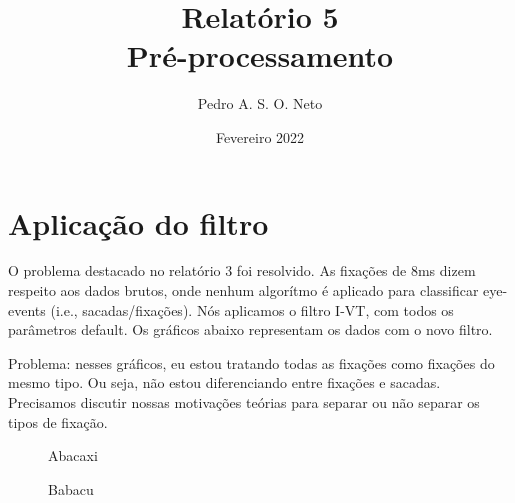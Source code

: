 \documentclass{article}
\title{Relatório 5 \\ Pré-processamento}
\author{Pedro A. S. O. Neto}
\date{Fevereiro 2022}
\begin{document}
\maketitle

\section{Aplicação do filtro}

O problema destacado no relatório 3 foi resolvido. As fixações de 8ms dizem respeito aos dados brutos, onde nenhum algorítmo é aplicado para classificar eye-events (i.e., sacadas/fixações).
Nós aplicamos o filtro I-VT, com todos os parâmetros default. Os gráficos abaixo representam os dados com o novo filtro.

Problema: nesses gráficos, eu estou tratando todas as fixações como fixações do mesmo tipo. Ou seja, não estou diferenciando entre fixações e sacadas. Precisamos discutir nossas motivações teórias para separar ou não separar os tipos de fixação.

\begin{figure}[t]
\caption{Abacaxi}
\noindent{}
\centering
\end{figure}

\begin{figure}[t]
\caption{Babacu}
\noindent{}
\centering
\end{figure}
\end{document}
